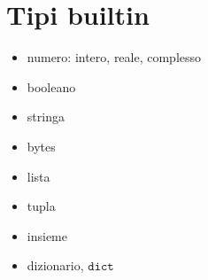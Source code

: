 \documentclass[letterpaper,10pt,english]{jupyterBook}
\begin{document}
\section{Tipi built\sphinxhyphen{}in}
\label{\detokenize{ch/programming/types:tipi-built-in}}\begin{itemize}
\item {} 
\sphinxAtStartPar
numero: intero, reale, complesso

\item {} 
\sphinxAtStartPar
booleano

\item {} 
\sphinxAtStartPar
stringa

\item {} 
\sphinxAtStartPar
bytes

\item {} 
\sphinxAtStartPar
lista

\item {} 
\sphinxAtStartPar
tupla

\item {} 
\sphinxAtStartPar
insieme

\item {} 
\sphinxAtStartPar
dizionario, \(\texttt{dict}\)

\end{itemize}
\end{document}
